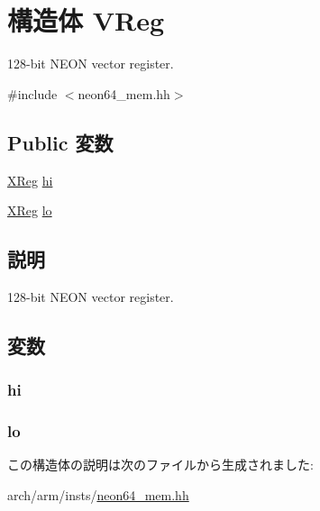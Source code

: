 \hypertarget{structArmISA_1_1VReg}{
\section{構造体 VReg}
\label{structArmISA_1_1VReg}
}


128-\/bit NEON vector register.  


{\ttfamily \#include $<$neon64\_\-mem.hh$>$}\subsection*{Public 変数}
\begin{DoxyCompactItemize}
\item 
\hyperlink{namespaceArmISA_a7fdeef747c8fdcfa4770debfb2dc823d}{XReg} \hyperlink{structArmISA_1_1VReg_a9cbce3ae7a48797456641eaba157bc46}{hi}
\item 
\hyperlink{namespaceArmISA_a7fdeef747c8fdcfa4770debfb2dc823d}{XReg} \hyperlink{structArmISA_1_1VReg_aa325de7a0ee69c1d272ca24080826924}{lo}
\end{DoxyCompactItemize}


\subsection{説明}
128-\/bit NEON vector register. 

\subsection{変数}
\hypertarget{structArmISA_1_1VReg_a9cbce3ae7a48797456641eaba157bc46}{
\subsubsection[{hi}]{ {\bf hi}}}
\label{structArmISA_1_1VReg_a9cbce3ae7a48797456641eaba157bc46}
\hypertarget{structArmISA_1_1VReg_aa325de7a0ee69c1d272ca24080826924}{
\subsubsection[{lo}]{ {\bf lo}}}
\label{structArmISA_1_1VReg_aa325de7a0ee69c1d272ca24080826924}


この構造体の説明は次のファイルから生成されました:\begin{DoxyCompactItemize}
\item 
arch/arm/insts/\hyperlink{neon64__mem_8hh}{neon64\_\-mem.hh}\end{DoxyCompactItemize}
